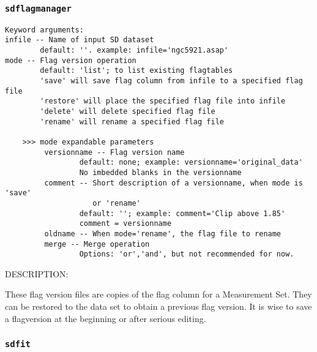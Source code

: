 \subsubsection{{\tt sdflagmanager}}
\label{section:sd.sdtasks.tasks.sdflagmanager}

\begin{verbatim}
Keyword arguments:
infile -- Name of input SD dataset
        default: ''. example: infile='ngc5921.asap'
mode -- Flag version operation
        default: 'list'; to list existing flagtables
        'save' will save flag column from infile to a specified flag file
        'restore' will place the specified flag file into infile
        'delete' will delete specified flag file
        'rename' will rename a specified flag file

    >>> mode expandable parameters             
         versionname -- Flag version name
                 default: none; example: versionname='original_data'
                 No imbedded blanks in the versionname
         comment -- Short description of a versionname, when mode is 'save' 
                    or 'rename'
                 default: ''; example: comment='Clip above 1.85'
                 comment = versionname
         oldname -- When mode='rename', the flag file to rename
         merge -- Merge operation
                 Options: 'or','and', but not recommended for now.

\end{verbatim}

DESCRIPTION:

These flag version files are copies of the flag column for a
Measurement Set.  They can be restored to the data set to obtain
a previous flag version.  It is wise to
save a flagversion at the beginning or after serious editing.    


\subsubsection{{\tt sdfit}}
\label{section:sd.sdtasks.tasks.sdfit}

